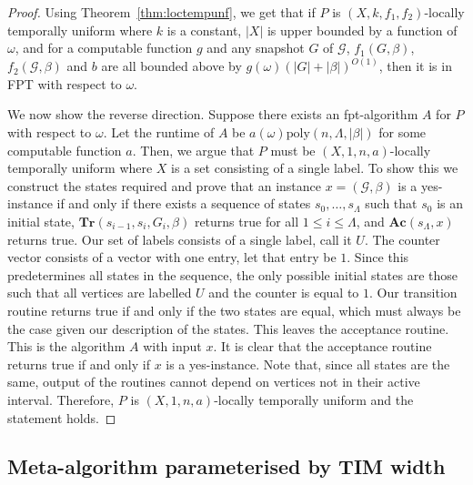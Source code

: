 \documentclass[a4paper,UKenglish,cleveref, autoref, thm-restate]{lipics-v2021} %
\begin{document}
\begin{proof}
    Using Theorem~\ref{thm:loctempunf}, we get that if $P$ is $(X,k,f_1,f_2)$-locally temporally uniform where $k$ is a constant, $|X|$ is upper bounded by a function of $\omega$, and for a computable function $g$ and any snapshot $G$ of $\mathcal{G}$, $f_1(G,\beta)$, $f_2(\mathcal{G},\beta)$ and $b$ are all bounded above by $g(\omega)(|G| + |\beta|)^{O(1)}$, then it is in FPT with respect to $\omega$.

    We now show the reverse direction. Suppose there exists an fpt-algorithm $A$ for $P$ with respect to $\omega$. Let the runtime of $A$ be $a(\omega)\text{poly}(n,\Lambda,|\beta|)$ for some computable function $a$. Then, we argue that $P$ must be $(X,1,n,a)$-locally temporally uniform where $X$ is a set consisting of a single label. To show this we construct the states required and prove that an instance $x=(\mathcal{G},\beta)$ is a yes-instance if and only if there exists a sequence of states $s_0,\ldots,s_{\Lambda}$ such that $s_0$ is an initial state, $\textbf{Tr}(s_{i-1},s_{i},G_{i},\beta)$ returns true for all $1\leq i \leq \Lambda$, and $\textbf{Ac}(s_{\Lambda}, x)$ returns true. Our set of labels consists of a single label, call it $U$. The counter vector consists of a vector with one entry, let that entry be $1$. Since this predetermines all states in the sequence, the only possible initial states are those such that all vertices are labelled $U$ and the counter is equal to $1$. Our transition routine returns true if and only if the two states are equal, which must always be the case given our description of the states. This leaves the acceptance routine. This is the algorithm $A$ with input $x$. It is clear that the acceptance routine returns true if and only if $x$ is a yes-instance. Note that, since all states are the same, output of the routines cannot depend on vertices not in their active interval.  Therefore, $P$ is $(X,1,n,a)$-locally temporally uniform and the statement holds.
\end{proof}
\subsection{Meta-algorithm parameterised by TIM width}\label{sec:TIM-alg}
\end{document}
